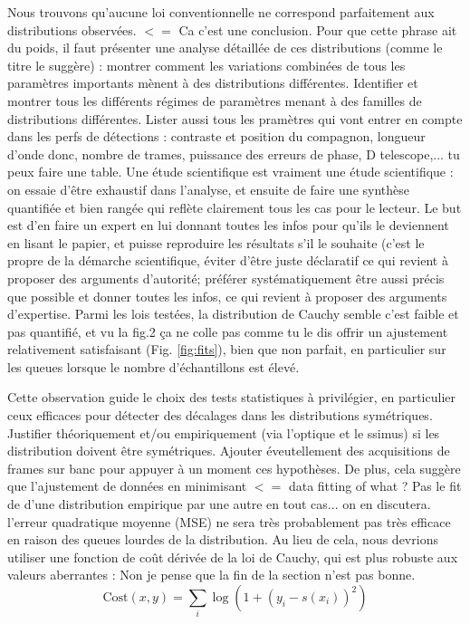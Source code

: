 \documentclass{article}
\newcommand{\dm}[1]{{\color{mulberry} #1}}
\begin{document}
Nous trouvons qu'aucune loi conventionnelle ne correspond parfaitement aux distributions observées. \dm{$<=$ Ca c'est une conclusion. Pour que cette phrase ait du poids, il faut présenter une analyse détaillée de ces distributions (comme le titre le suggère) : montrer comment les variations combinées de tous les paramètres importants mènent à des distributions différentes. Identifier et montrer tous les différents régimes de paramètres menant à des familles de distributions différentes. Lister aussi tous les pramètres qui vont entrer en compte dans les perfs de détections : contraste et position du compagnon, longueur d'onde donc, nombre de trames, puissance des erreurs de phase, D telescope,... tu peux faire une table. Une étude scientifique est vraiment une étude scientifique : on essaie d'être exhaustif dans l'analyse, et ensuite de faire une synthèse quantifiée et bien rangée qui reflète clairement tous les cas pour le lecteur. Le but est d'en faire un expert en lui donnant toutes les infos pour qu'ils le deviennent en lisant le papier, et puisse reproduire les résultats s'il le souhaite (c'est le propre de la démarche scientifique, éviter d'être juste déclaratif ce qui revient à proposer des arguments d'autorité; préférer systématiquement être aussi précis que possible et donner toutes les infos, ce qui revient à proposer des arguments d'expertise.} Parmi les lois testées, la distribution de Cauchy semble \dm{c'est faible et pas quantifié, et vu la fig.2 ça ne colle pas comme tu le dis} offrir un ajustement relativement satisfaisant (Fig. \ref{fig:fits}), bien que non parfait, en particulier sur les queues lorsque le nombre d'échantillons est élevé.

Cette observation guide le choix des tests statistiques à privilégier, en particulier ceux efficaces pour détecter des décalages dans les distributions symétriques.\dm{Justifier théoriquement et/ou empiriquement (via l'optique et le ssimus) si les distribution doivent être symétriques. Ajouter éveutellement des acquisitions de frames sur banc pour appuyer à un moment ces hypothèses. } De plus, cela suggère que l'ajustement de données en minimisant \dm{$<=$ data fitting of what ? Pas le fit de d'une distribution empirique par une autre en tout cas... on en discutera. } l'erreur quadratique moyenne (MSE) ne sera très probablement pas très efficace en raison des queues lourdes de la distribution. Au lieu de cela, nous devrions utiliser une fonction de coût dérivée de la loi de Cauchy, qui est plus robuste aux valeurs aberrantes :\dm{Non je pense que la fin de la section n'est pas bonne.}
\begin{equation}
    \text{Cost}(x, y) = \sum_i \log \left( 1 + \left( y_i - s(x_i )\right)^2 \right)
\end{equation}
\end{document}
